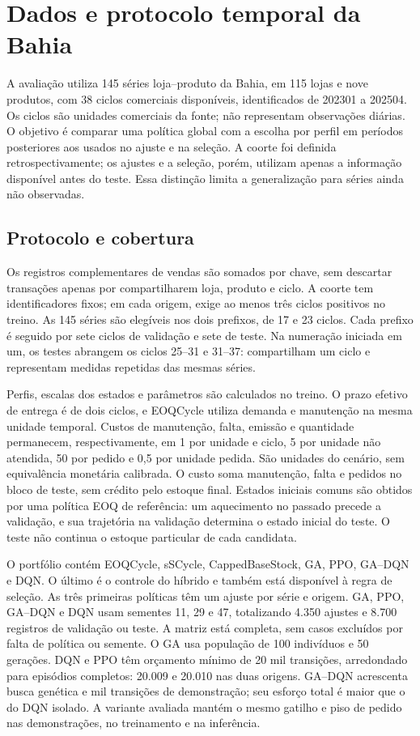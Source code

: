 \section{Dados e protocolo temporal da Bahia}
\label{sec:ba2026_methods}

A avaliação utiliza 145 séries loja--produto da Bahia, em 115 lojas e nove produtos, com 38 ciclos comerciais disponíveis, identificados de 202301 a 202504. Os ciclos são unidades comerciais da fonte; não representam observações diárias. O objetivo é comparar uma política global com a escolha por perfil em períodos posteriores aos usados no ajuste e na seleção. A coorte foi definida retrospectivamente; os ajustes e a seleção, porém, utilizam apenas a informação disponível antes do teste. Essa distinção limita a generalização para séries ainda não observadas.

\subsection{Protocolo e cobertura}

Os registros complementares de vendas são somados por chave, sem descartar transações apenas por compartilharem loja, produto e ciclo. A coorte tem identificadores fixos; em cada origem, exige ao menos três ciclos positivos no treino. As 145 séries são elegíveis nos dois prefixos, de 17 e 23 ciclos. Cada prefixo é seguido por sete ciclos de validação e sete de teste. Na numeração iniciada em um, os testes abrangem os ciclos 25--31 e 31--37: compartilham um ciclo e representam medidas repetidas das mesmas séries.

Perfis, escalas dos estados e parâmetros são calculados no treino. O prazo efetivo de entrega é de dois ciclos, e EOQCycle utiliza demanda e manutenção na mesma unidade temporal. Custos de manutenção, falta, emissão e quantidade permanecem, respectivamente, em 1 por unidade e ciclo, 5 por unidade não atendida, 50 por pedido e 0,5 por unidade pedida. São unidades do cenário, sem equivalência monetária calibrada. O custo soma manutenção, falta e pedidos no bloco de teste, sem crédito pelo estoque final. Estados iniciais comuns são obtidos por uma política EOQ de referência: um aquecimento no passado precede a validação, e sua trajetória na validação determina o estado inicial do teste. O teste não continua o estoque particular de cada candidata.

O portfólio contém EOQCycle, sSCycle, CappedBaseStock, GA, PPO, GA--DQN e DQN. O último é o controle do híbrido e também está disponível à regra de seleção. As três primeiras políticas têm um ajuste por série e origem. GA, PPO, GA--DQN e DQN usam sementes 11, 29 e 47, totalizando 4.350 ajustes e 8.700 registros de validação ou teste. A matriz está completa, sem casos excluídos por falta de política ou semente. O GA usa população de 100 indivíduos e 50 gerações. DQN e PPO têm orçamento mínimo de 20 mil transições, arredondado para episódios completos: 20.009 e 20.010 nas duas origens. GA--DQN acrescenta busca genética e mil transições de demonstração; seu esforço total é maior que o do DQN isolado. A variante avaliada mantém o mesmo gatilho e piso de pedido nas demonstrações, no treinamento e na inferência.

